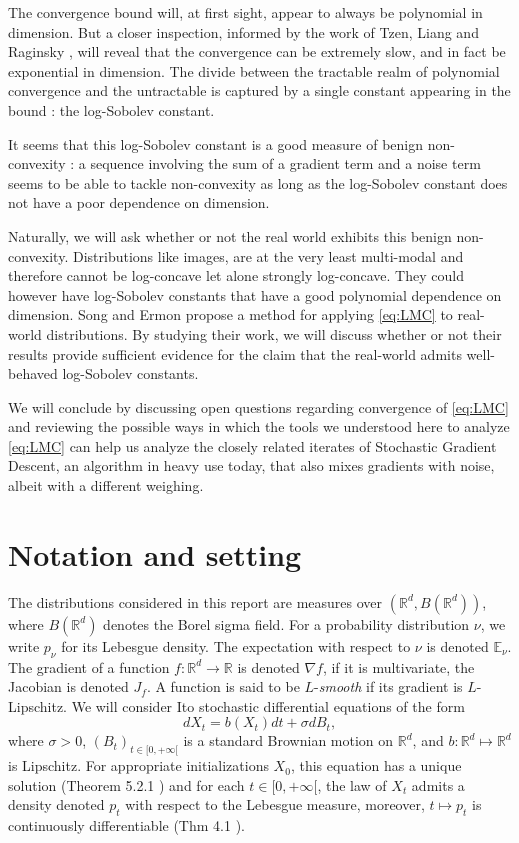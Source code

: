 \documentclass[10pt,journal,a4paper]{IEEEtran}
\theoremstyle{definition}
\newcommand{\E}{\mathbb{E}}
\newcommand{\R}{\mathbb{R}}
\begin{document}
The convergence bound will, at first sight, appear to always be polynomial in dimension. But a closer inspection, informed by the work of Tzen, Liang and Raginsky \cite{tzen_local_2018}, will reveal that the convergence can be extremely slow, and in fact be exponential in dimension. The divide between the tractable realm of polynomial convergence and the untractable is captured by a single constant appearing in the bound : the log-Sobolev constant. 

It seems that this log-Sobolev constant is a good measure of benign non-convexity : a sequence involving the sum of a gradient term and a noise term seems to be able to tackle non-convexity as long as the log-Sobolev constant does not have a poor dependence on dimension.

Naturally, we will ask whether or not the real world exhibits this benign non-convexity. Distributions like images, are at the very least multi-modal and therefore cannot be log-concave let alone strongly log-concave. They could however have log-Sobolev constants that have a good polynomial dependence on dimension. Song and Ermon propose a method for applying \eqref{eq:LMC} to real-world distributions. By studying their work, we will discuss whether or not  their results provide sufficient evidence for the claim that the real-world admits well-behaved log-Sobolev constants.

We will conclude by discussing open questions regarding convergence of \eqref{eq:LMC} and reviewing the possible ways in which the tools we understood here to analyze \eqref{eq:LMC} can help us analyze the closely related iterates of Stochastic Gradient Descent, an algorithm in heavy use today, that also mixes gradients with noise, albeit with a different weighing.

\section{Notation and setting}

The distributions considered in this report are measures over $(\R^d, B(\R^d))$, where $B(\R^d)$ denotes the Borel sigma field. For a probability distribution $\nu$, we write $p_\nu$ for its Lebesgue density. The expectation with respect to $\nu$ is denoted $\E_\nu$. The gradient of a function $f: \R^d \rightarrow \R$ is denoted $\nabla f$, if it is multivariate, the Jacobian is denoted $J_f$. A function is said to be $L$-\textit{smooth} if its gradient is $L$-Lipschitz. We will consider Ito stochastic differential equations of the form 
\[
dX_t =  b(X_t)dt + \sigma dB_t,
\]
where $\sigma > 0$, $(B_t)_{t\in [0, +\infty[}$ is a standard Brownian motion on $\R^d$, and $b: \R^d \mapsto \R^d$ is Lipschitz. For appropriate initializations $X_0$, this equation has a unique solution (Theorem 5.2.1 \cite{oksendal_stochastic_2003}) and for each $t\in [0, +\infty[$, the law of $X_t$ admits a density denoted $p_t$ with respect to the Lebesgue measure, moreover, $t \mapsto p_t$ is continuously differentiable (Thm 4.1 \cite{pavliotis_fokkerplanck_2014}). 
\end{document}

